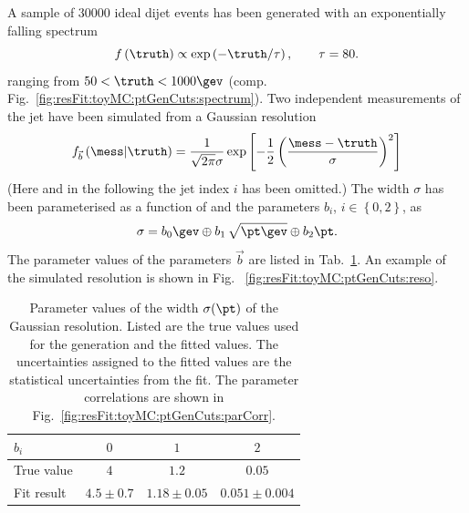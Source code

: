 \documentclass[a4paper]{cmspaper} %
\begin{document}
A sample of 30000 ideal dijet events has been generated with an
exponentially falling spectrum
\begin{equation}
  \label{eq:resFit:toyMCSpec}
  f\left(\truth\right) \propto \exp\left(-\truth / \tau\right),
  \qquad \tau = 80.
\end{equation}
ranging from \mbox{$50 < \truth < 1000\gev$} (comp. Fig.~\ref{fig:resFit:toyMC:ptGenCuts:spectrum}).
Two independent measurements of the jet \pt have been simulated
from a Gaussian resolution
\begin{equation}
  \label{eq:resFit:toyMCRes}
  f_{\vec{b}}\left(\mess|\truth\right) = 
  \frac{1}{\sqrt{2\pi}\sigma}\exp\left[-\frac{1}{2}\left(\frac{\mess - \truth}{\sigma}\right)^{2}\right]
\end{equation}
(Here and in the following the jet index $i$ has been omitted.)
The width $\sigma$ has been parameterised as a function of \truth and
the parameters $b_{i}$, \mbox{$i\in\left\{0,2\right\}$}, as
\begin{equation}
  \label{eq:resFit:toyMCSigma}
  \sigma = b_{0}\gev
  \oplus b_{1}\,\sqrt{\pt\gev}\oplus b_{2}\pt.
\end{equation}
The parameter values of the parameters $\vec{b}$ are listed in
Tab.~\ref{tab:resFit:toyMC:ptGenCuts:fitResult}.
An example of the simulated resolution is shown in Fig. ~\ref{fig:resFit:toyMC:ptGenCuts:reso}.

\begin{table}[ht]
  \centering
  \begin{tabular}[ht]{lccc}
    \hline \hline
    $b_{i}$ & $0$ & $1$ & $2$ \\
    \hline
    True value & $4$           & $1.2$           & $0.05$ \\
    Fit result & $4.5 \pm 0.7$ & $1.18 \pm 0.05$ & $0.051 \pm 0.004$ \\
    \hline \hline
  \end{tabular}
  \caption{Parameter values of the width $\sigma(\pt)$ of the Gaussian
    resolution. Listed are the true values used for the generation and
    the fitted values. The uncertainties assigned to the fitted values
    are the statistical uncertainties from the fit. The parameter
    correlations are shown in Fig.~\ref{fig:resFit:toyMC:ptGenCuts:parCorr}.}
  \label{tab:resFit:toyMC:ptGenCuts:fitResult}
\end{table}
\end{document}
